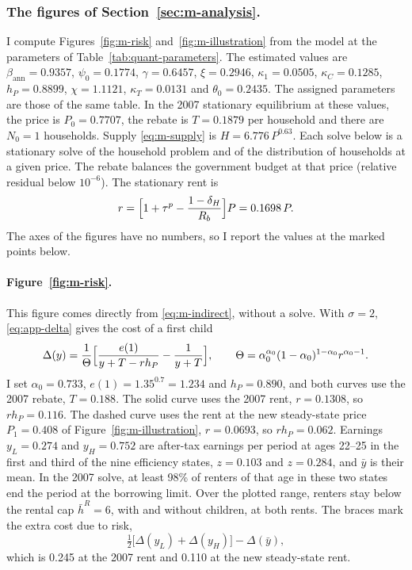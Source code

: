 \subsubsection*{The figures of Section~\ref{sec:m-analysis}.}
\label{app:model-figures}
I compute Figures~\ref{fig:m-risk} and~\ref{fig:m-illustration} from the model at the parameters of
Table~\ref{tab:quant-parameters}. The estimated values are
$\beta_{\text{ann}}=0.9357$, $\psi_0=0.1774$, $\gamma=0.6457$, $\xi=0.2946$,
$\kappa_1=0.0505$, $\kappa_C=0.1285$, $h_P=0.8899$, $\chi=1.1121$,
$\kappa_T=0.0131$ and $\theta_0=0.2435$. The assigned parameters are those of
the same table. In the 2007 stationary equilibrium at these values, the price
is $P_0=0.7707$, the rebate is $T=0.1879$ per household and there are $N_0=1$
households. Supply \eqref{eq:m-supply} is $H=6.776\,P^{0.63}$. Each solve
below is a stationary solve of the household problem and of the distribution
of households at a given price. The rebate balances the government budget at
that price (relative residual below $10^{-6}$). The stationary rent is
\[
 r=\Bigl[1+\tau^p-\frac{1-\delta_H}{R_b}\Bigr]P=0.1698\,P .
\]
The axes of the figures have no numbers, so I report the values at the
marked points below.

\paragraph{Figure~\ref{fig:m-risk}.} This figure comes directly from
\eqref{eq:m-indirect}, without a solve. With $\sigma=2$, \eqref{eq:app-delta}
gives the cost of a first child
\[
 \Delta(y)=\frac{1}{\Theta}\Bigl[\frac{e(1)}{y+T-rh_P}-\frac{1}{y+T}\Bigr],
 \qquad
 \Theta=\alpha_0^{\alpha_0}(1-\alpha_0)^{1-\alpha_0}r^{\alpha_0-1}.
\]
I set $\alpha_0=0.733$, $e(1)=1.35^{0.7}=1.234$ and $h_P=0.890$, and both
curves use the 2007 rebate, $T=0.188$. The solid curve uses the 2007 rent,
$r=0.1308$, so $rh_P=0.116$. The dashed curve uses the rent at the new
steady-state price $P_1=0.408$ of Figure~\ref{fig:m-illustration},
$r=0.0693$, so $rh_P=0.062$. Earnings $y_L=0.274$ and $y_H=0.752$ are
after-tax earnings per period at ages 22--25 in the first and third of the
nine efficiency states, $z=0.103$ and $z=0.284$, and $\bar y$ is their mean.
In the 2007 solve, at least 98\% of renters of that age in these two states
end the period at the borrowing limit. Over the plotted range, renters stay
below the rental cap $\bar h^R=6$, with and without children, at both rents.
The braces mark the extra cost due to risk,
\[
 \tfrac12\bigl[\Delta(y_L)+\Delta(y_H)\bigr]-\Delta(\bar y),
\]
which is 0.245 at the 2007 rent and 0.110 at the new steady-state rent.

